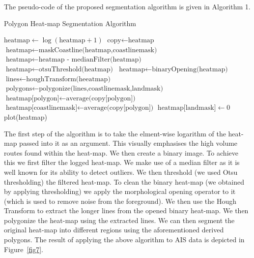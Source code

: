 \documentclass{article}
\begin{document}
The pseudo-code of the proposed segmentation algorithm is given in Algorithm 1. 
\begin{algorithm}
 \caption{Polygon Heat-map Segmentation Algorithm}\label{euclid}
 \begin{algorithmic}[1]
 \State $\textrm{heatmap} \gets \log(\textrm{heatmap}+1)$
 \State $\textrm{copy} \gets \textrm{heatmap}$
 \State $\textrm{heatmap} \gets \textrm{maskCoastline(heatmap,coastlinemask)}$
 \State $\textrm{heatmap} \gets \textrm{heatmap - medianFilter(heatmap)}$ 
 \State $\textrm{heatmap} \gets \textrm{otsuThreshold(heatmap)}$
 \State $\textrm{heatmap} \gets \textrm{binaryOpening(heatmap)}$
 \State $\textrm{lines} \gets \textrm{houghTransform(heeatmap)}$
 \State $\textrm{polygons} \gets \textrm{polygonize(lines,coastlinemask,landmask)}$
     \State $\textrm{heatmap[polygon]} \gets \textrm{average(copy[polygon])}$ 
 \EndFor
 \State $\textrm{heatmap[coastlinemask]} \gets \textrm{average(copy[polygon])}$
 \State $\textrm{heatmap[landmask]} \gets 0$
 \State plot(heatmap)
 
 \EndProcedure
 \end{algorithmic}
 \end{algorithm}
The first step of the algorithm is to take the elment-wise logarithm of the heat-map passed into it as an argument. This visually emphasises the high volume routes found within the heat-map. We then 
create a binary image. To achieve this we first filter the logged heat-map. We make use of a median filter as it is well known for its ability to detect outliers. We then threshold (we used Otsu thresholding) the  
filtered heat-map. To clean the binary heat-map (we obtained by applying thresholding) we apply the morphological opening operator to it (which is used to remove noise from the foreground).
We then use the Hough Transform to extract the longer lines from the opened binary heat-map. We then polygonize the heat-map using the extracted lines. We can then 
segment the original heat-map into different regions using the aforementioned derived polygons. The result of applying the above algorithm to AIS data is depicted in Figure~\ref{fig7}.
\end{document}
